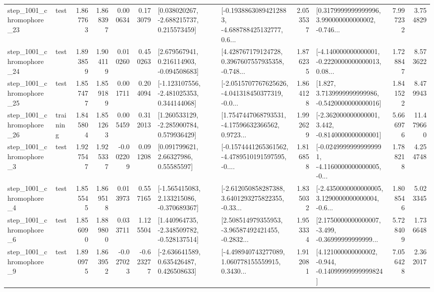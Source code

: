 \begin{tabular}{llrrrrllrlrr}
 step\_1001\_chromophore\_23 &      test &      1.867763 &    1.868397 &      0.000634 &  0.173079 &    [0.038020267, -2.688215737, 0.215573459] &  [-0.19388630894212883, -4.688788425132777, 0.6... &       2.053537 &  [0.3179999999999996, 3.990000000000002, -0.746... &            7.997232 &          3.754829 \\
 step\_1001\_chromophore\_24 &      test &      1.893859 &    1.904119 &      0.010260 &  0.450263 &    [2.679567941, 0.216114903, -0.094508683] &  [4.428767179124728, 0.3967607557935358, -0.748... &       1.876235 &  [-4.140000000000001, -0.2220000000000013, 0.08... &            1.728847 &          8.573622 \\
 step\_1001\_chromophore\_25 &      test &      1.857477 &    1.859189 &      0.001711 &  0.204094 &   [-1.123107556, -2.481025353, 0.344144068] &  [-2.0515707767625626, -4.041318450377319, -0.0... &       1.864128 &   [1.827, 3.7139999999999986, -0.5420000000000016] &            1.841522 &          8.479943 \\
 step\_1001\_chromophore\_26 &  training &      1.845804 &    1.851263 &      0.005459 &  0.312013 &    [1.260533129, -2.285900784, 0.579936429] &  [1.7547447068793531, -4.17596632366562, 0.9723... &       1.992629 &   [-2.362000000000001, 3.442, -0.8140000000000001] &            5.666976 &         11.479660 \\
  step\_1001\_chromophore\_3 &      test &      1.927547 &    1.925337 &     -0.002209 &  0.091208 &       [0.091799621, 2.66327986, 0.55585597] &  [-0.1574441265361562, -4.4789510191597595, -0.... &       1.816858 &  [-0.02499999999999991, -4.1160000000000005, -0... &            1.788218 &          4.254748 \\
  step\_1001\_chromophore\_4 &      test &      1.855545 &    1.869518 &      0.013973 &  0.557165 &   [-1.565415083, 2.133215086, -0.370689367] &  [-2.612050858287388, 3.6401293275822355, -0.33... &       1.835032 &  [-2.4350000000000005, 3.1290000000000004, -0.6... &            1.808546 &          5.023345 \\
  step\_1001\_chromophore\_6 &      test &      1.856090 &    1.889800 &      0.033711 &  1.125504 &   [1.440964735, -2.348509782, -0.528137514] &  [2.508514979355953, -3.96587492421455, -0.2832... &       1.953334 &  [2.1750000000000007, -3.499, -0.36999999999999... &            5.728409 &          1.736648 \\
  step\_1001\_chromophore\_9 &      test &      1.890975 &    1.863952 &     -0.027023 & -0.623277 &    [-2.636641589, 0.635426487, 0.426508633] &  [-4.498940743277089, 1.060778155559915, 0.3430... &       1.912081 &  [4.121000000000002, -0.944, -0.14099999999999824] &            7.056428 &          2.362017 \\

\end{tabular}
